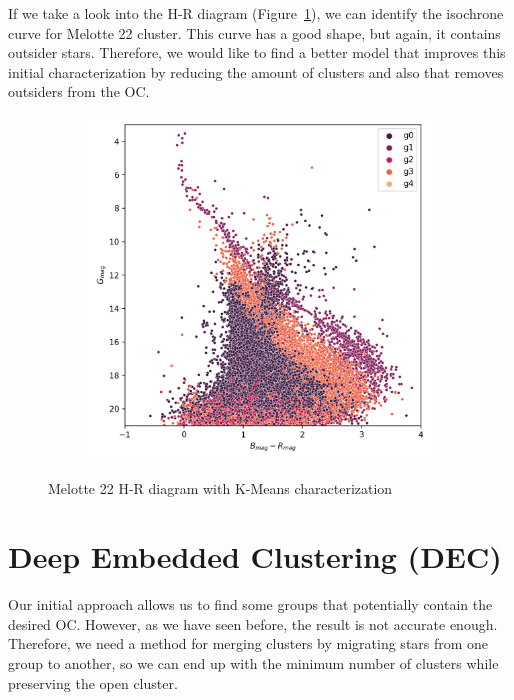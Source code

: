 \documentclass[11pt, a4paper, english]{book}
\begin{document}
If we take a look into the H-R diagram (Figure~\ref{fig:kmeans_hr_diagram_melotte_22}),
we can identify the isochrone curve for Melotte 22 cluster.
This curve has a good shape, but again, it contains outsider stars.
Therefore, we would like to find a better model that improves this initial characterization
by reducing the amount of clusters and also that removes outsiders from the OC.

\begin{figure}[htbp]
  \centering
  \begin{subfigure}{0.5\textwidth}
    \centering
    \includegraphics[width=\textwidth]{../figures/melotte_22/kmeans_hr_diagram_melotte_22.png}
  \end{subfigure}
  \caption{Melotte 22 H-R diagram with K-Means characterization}
  \label{fig:kmeans_hr_diagram_melotte_22}
\end{figure}

\section{Deep Embedded Clustering (DEC)}
\label{sec:deep_embedding_clustering}

Our initial approach allows us to find some groups that potentially contain the desired OC.
However, as we have seen before, the result is not accurate enough.
Therefore, we need a method for merging clusters by migrating stars from one group to another,
so we can end up with the minimum number of clusters while preserving the open cluster.
\end{document}
